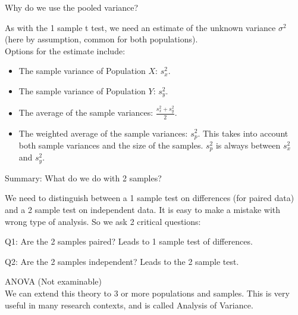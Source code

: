 \documentclass[t,xcolor=pdftex,dvipsnames,table]{beamer}\usepackage[]{graphicx}\usepackage[]{color}
\begin{document}
\begin{frame}{Why do we use the pooled variance? }

As with the 1 sample t test, we need an estimate of the unknown variance $\sigma^2$ (here by assumption, common for both populations). \\

Options for the estimate include:

\begin{itemize}
\item The sample variance of Population $X$: $s_{x}^2$.
\item The sample variance of Population $Y$: $s_{y}^2$.
\item The average of the sample variances: $\frac{s_{x}^2 + s_{y}^2}{2}$.
\item The weighted average of the sample variances: $s_{p}^2$. This takes into account both sample variances and the size of the samples. $s_{p}^2$ is always between $s_{x}^2$ and $s_{y}^2$.
\end{itemize}





\end{frame}





\begin{frame}{Summary: What do we do with 2 samples? }

We need to distinguish between a 1 sample test on differences (for paired data) and a 2 sample test on independent data. It is easy to make a mistake with wrong type of analysis. So we ask 2 critical questions:

\vspace{.5cm}
Q1: Are the 2 samples paired? Leads to 1 sample test of differences. \\
\vspace{.5cm}

Q2: Are the 2 samples independent? Leads to the 2 sample test.

\vspace{.5cm}
ANOVA (Not examinable) \\
We can extend this theory to 3 or more populations and samples. This is very useful in many research contexts, and is called Analysis of Variance.
\end{frame}
\end{document}
